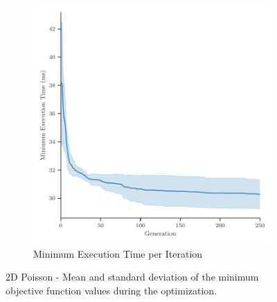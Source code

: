 \begin{figure}
\begin{subfigure}[b]{0.49\textwidth}
		\includegraphics[width=\textwidth]{figures/minimum_execution_time_2D_FD_Poisson_fromL2.pdf}
		\caption{Minimum Execution Time per Iteration}
		\label{fig:poisson-2D-minimum-execution-time}
	\end{subfigure}
	\caption{2D Poisson - Mean and standard deviation of the minimum objective function values during the optimization.}
	\label{fig:poisson-2D-minimum-objectives}
\end{figure}
